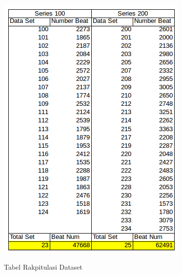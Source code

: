 \begin{table}[H]
	\centering
	\includegraphics[scale=0.7]{images/tabel_data.png}
	\caption{Tabel Rakpitulasi Dataset}
	\label{tabel:dataset}
\end{table}	

